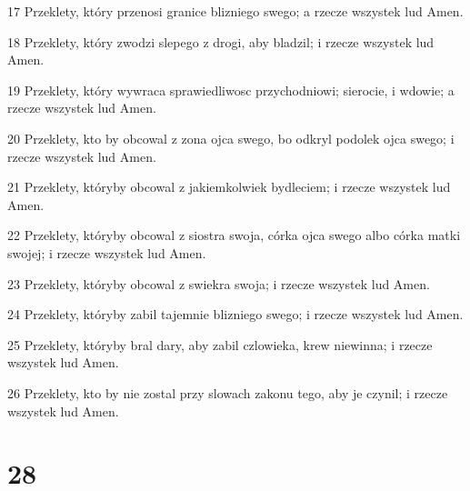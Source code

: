 \par 17 Przeklety, który przenosi granice blizniego swego; a rzecze wszystek lud Amen.
\par 18 Przeklety, który zwodzi slepego z drogi, aby bladzil; i rzecze wszystek lud Amen.
\par 19 Przeklety, który wywraca sprawiedliwosc przychodniowi; sierocie, i wdowie; a rzecze wszystek lud Amen.
\par 20 Przeklety, kto by obcowal z zona ojca swego, bo odkryl podolek ojca swego; i rzecze wszystek lud Amen.
\par 21 Przeklety, któryby obcowal z jakiemkolwiek bydleciem; i rzecze wszystek lud Amen.
\par 22 Przeklety, któryby obcowal z siostra swoja, córka ojca swego albo córka matki swojej; i rzecze wszystek lud Amen.
\par 23 Przeklety, któryby obcowal z swiekra swoja; i rzecze wszystek lud Amen.
\par 24 Przeklety, któryby zabil tajemnie blizniego swego; i rzecze wszystek lud Amen.
\par 25 Przeklety, któryby bral dary, aby zabil czlowieka, krew niewinna; i rzecze wszystek lud Amen.
\par 26 Przeklety, kto by nie zostal przy slowach zakonu tego, aby je czynil; i rzecze wszystek lud Amen.

\chapter{28}

